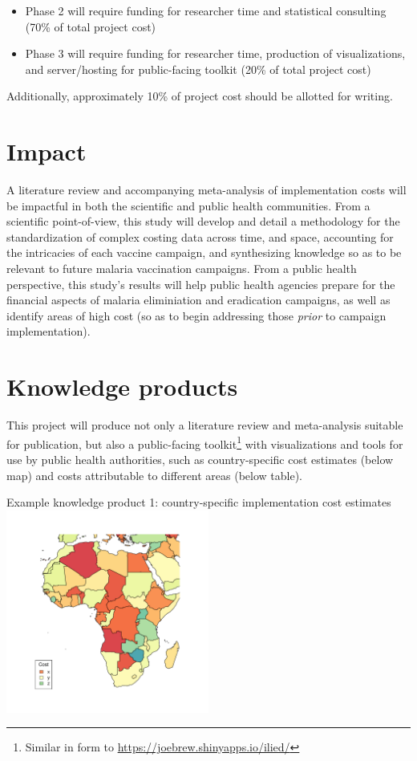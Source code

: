 \documentclass{article}
\begin{document}
\begin{itemize}
  \setlength\itemsep{0em}
\item Phase 2 will require funding for researcher time and statistical consulting (70\% of total project cost)
\item Phase 3 will require funding for researcher time, production of visualizations, and server/hosting for public-facing toolkit (20\% of total project cost)
\end{itemize}

Additionally, approximately 10\% of project cost should be allotted for writing.

\section*{Impact}

A literature review and accompanying meta-analysis of implementation costs will be impactful in both the scientific and public health communities. From a scientific point-of-view, this study will develop and detail a methodology for the standardization of complex costing data across time, and space, accounting for the intricacies of each vaccine campaign, and synthesizing knowledge so as to be relevant to future malaria vaccination campaigns. From a public health perspective, this study's results will help public health agencies prepare for the financial aspects of malaria eliminiation and eradication campaigns, as well as identify areas of high cost (so as to begin addressing those \emph{prior} to campaign implementation). 

\newpage

\section*{Knowledge products}

This project will produce not only a literature review and meta-analysis suitable for publication, but also a public-facing toolkit\footnote{Similar in form to \href{https://joebrew.shinyapps.io/ilied/}{https://joebrew.shinyapps.io/ilied/}} with visualizations and tools for use by public health authorities, such as country-specific cost estimates (below map) and costs attributable to different areas (below table). 


\begin{center}
Example knowledge product 1: country-specific implementation cost estimates
\includegraphics[width=0.5\textwidth]{map.pdf}
\end{center}
\end{document}
